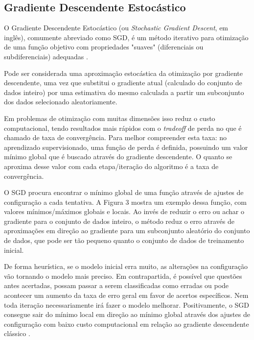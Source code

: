 \subsection{Gradiente Descendente Estocástico}

O Gradiente Descendente Estocástico (ou \textit{Stochastic Gradient Descent}, em inglês), comumente abreviado como SGD, é um método iterativo para otimização de uma função objetivo com propriedades "suaves" (diferenciais ou subdiferenciais) adequadas \cite{ruder2016overview}.

Pode ser considerada uma aproximação estocástica da otimização por gradiente descendente, uma vez que substitui o gradiente atual (calculado do conjunto de dados inteiro) por uma estimativa do mesmo calculada a partir um subconjunto dos dados selecionado aleatoriamente.

Em problemas de otimização com muitas dimensões isso reduz o custo computacional, tendo resultados mais rápidos com o \textit{tradeoff} de perda no que é chamado de taxa de convergência. Para melhor compreender esta taxa: no aprendizado supervisionado, uma função de perda é definida, possuindo um valor mínimo global que é buscado através do gradiente descendente. O quanto se aproxima desse valor com cada etapa/iteração do algoritmo é a taxa de convergência.

O SGD procura encontrar o mínimo global de uma função através de ajustes de configuração a cada tentativa. A Figura 3 mostra um exemplo dessa função, com valores mínimos/máximos globais e locais. Ao invés de reduzir o erro ou achar o gradiente para o conjunto de dados inteiro, o método reduz o erro através de aproximações em direção ao gradiente para um subconjunto aleatório do conjunto de dados, que pode ser tão pequeno quanto o conjunto de dados de treinamento inicial.

De forma heurística, se o modelo inicial erra muito, as alterações na configuração vão tornando o modelo mais preciso. Em contrapartida, é possível que questões antes acertadas, possam passar a serem classificadas como erradas ou pode acontecer um aumento da taxa de erro geral em favor de acertos específicos. Nem toda iteração necessariamente irá fazer o modelo melhorar.
Positivamente, o SGD consegue sair do mínimo local em direção ao mínimo global através dos ajustes de configuração com baixo custo computacional em relação ao gradiente descendente clássico \cite{overview_gradient_descent_stochastic}.

